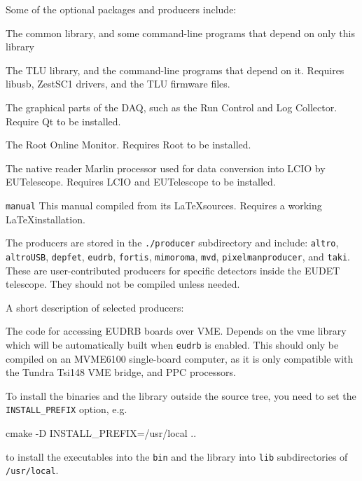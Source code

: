 Some of the optional packages and producers include:
\begin{description}

The common library, and some command-line programs that depend on only this library

The \gls{TLU} library, and the command-line programs that depend on
it. Requires libusb, ZestSC1 drivers, and the TLU firmware files.

The graphical parts of the DAQ, such as the Run Control and Log
Collector. Require Qt to be installed.

The Root Online Monitor. Requires Root to be installed.

The native reader Marlin processor used for data conversion into LCIO
by EUTelescope. Requires LCIO and EUTelescope to be installed.

\texttt{manual}
This manual compiled from its \LaTeX sources. Requires a working
\LaTeX installation.

\end{description}

The producers are stored in the \texttt{./producer} subdirectory and
include: \texttt{altro}, \texttt{altroUSB}, \texttt{depfet},
\texttt{eudrb}, \texttt{fortis}, \texttt{mimoroma}, \texttt{mvd},
\texttt{pixelmanproducer}, and \texttt{taki}. These are
user-contributed producers for specific detectors inside the EUDET
telescope.  They should not be compiled unless needed.

A short description of selected producers:
\begin{description}

The code for accessing EUDRB boards over VME.  Depends
on the vme library which will be automatically built
when \texttt{eudrb} is enabled. This should only be compiled on an
MVME6100 single-board computer, as it is only compatible with the
Tundra Tsi148 VME bridge, and PPC processors.
\end{description}



To install the binaries and the library outside the source tree, you
need to set the \texttt{INSTALL\_PREFIX} option, e.g.
\begin{listing}[mybash]
cmake -D INSTALL_PREFIX=/usr/local ..
\end{listing}
to install the executables into the \texttt{bin} and the library into \texttt{lib} subdirectories of \texttt{/usr/local}.

